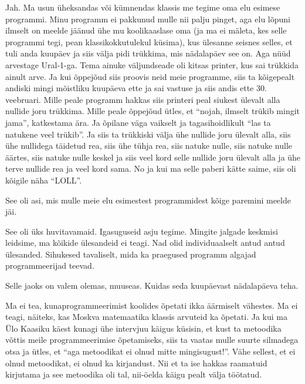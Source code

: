 Jah. Ma usun üheksandas või kümnendas klassis me tegime oma elu esimese 
programmi. Minu  programm ei pakkunud mulle nii palju pinget, aga elu lõpuni 
ilmselt on meelde jäänud ühe mu koolikaaslase oma (ja ma ei mäleta, kes selle 
programmi tegi, pean klassikokkutulekul küsima), kus ülesanne seisnes selles, 
et tuli anda kuupäev ja siis  välja pidi trükkima, mis nädalapäev see on. Aga 
nüüd arvestage Ural-1-ga. Tema ainuke väljundseade oli 
kitsas printer, kus sai trükkida ainult arve. Ja kui õppejõud siis proovis neid 
meie programme, siis ta kõigepealt andiski mingi mõistliku kuupäeva ette ja sai 
vastuse ja siis andis ette 30. veebruari. Mille peale programm hakkas siis 
printeri peal siukest ülevalt alla nullide joru trükkima. Mille peale õppejõud 
ütles, et \enquote{nojah, ilmselt trükib mingit jama}, katkestama ära. Ja 
õpilane väga vaikselt ja tagasihoidlikult \enquote{las ta natukene veel 
trükib}. Ja siis ta trükkiski välja ühe nullide joru ülevalt alla, siis ühe 
nullidega täidetud rea, siis ühe tühja rea, siis natuke nulle, siis natuke 
nulle äärtes, siis natuke nulle keskel ja siis veel kord selle nullide joru 
ülevalt alla ja ühe terve nullide rea ja veel kord sama. No ja kui ma selle 
paberi kätte saime, siis oli kõigile näha \enquote{LOLL}. 

See oli asi, mis mulle meie elu esimestest programmidest kõige paremini meelde 
jäi. 


See oli üks huvitavamaid. Igasuguseid asju tegime. Mingite jalgade keskmisi 
leidsime, ma kõikide ülesandeid ei teagi. Nad olid individuaalselt antud antud 
ülesanded. Sihukesed tavaliselt, mida ka praegused programm algajad 
programmeerijad teevad.

Selle jaoks on valem olemas, muuseas. Kuidas seda kuupäevast nädalapäeva teha. 


Ma ei tea, kunaprogrammeerimist koolides õpetati ikka äärmiselt vähestes. Ma ei 
teagi, näiteks, kas Moskva matemaatika klassis arvuteid ka õpetati. Ja kui ma 
Ülo Kaasiku käest kunagi ühe intervjuu käigus küsisin, 
et  kust ta metoodika võttis meile programmeerimise õpetamiseks, siis ta vaatas 
mulle suurte silmadega otsa ja ütles, et \enquote{aga metoodikat ei olnud mitte 
mingisugust!}. Vähe sellest, et ei olnud metoodikat, ei olnud ka kirjandust. 
Nii et ta ise hakkas  raamatuid kirjutama ja see metoodika oli tal, nii-öelda 
käigu pealt välja töötatud.

